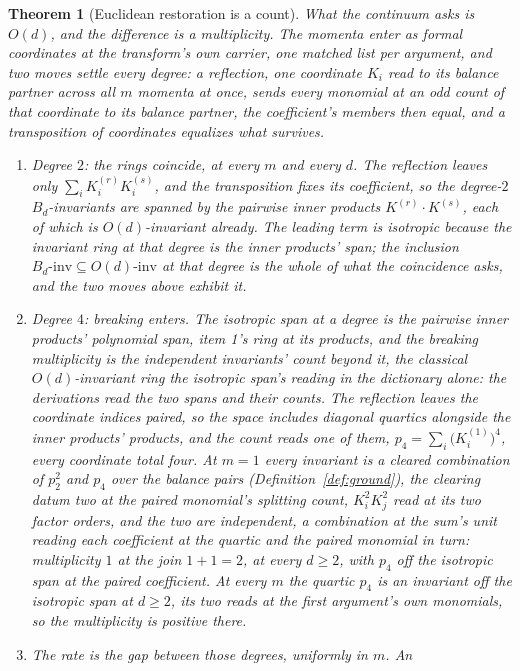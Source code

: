 \documentclass[11pt]{article}
\newtheorem{theorem}{Theorem}
\theoremstyle{definition}
\begin{document}
\begin{theorem}[Euclidean restoration is a count]
\emph{What the continuum asks is $O(d)$, and the difference is a multiplicity.}
The momenta enter as formal coordinates at the transform's own
carrier, one matched list per argument, and two moves settle every
degree: a reflection, one coordinate $K_i$
read to its balance partner
across all $m$ momenta at once, sends every monomial at an odd count
of that coordinate to its balance partner, the coefficient's
members then equal, and a transposition of
coordinates equalizes what survives.
\begin{enumerate}[leftmargin=2em,itemsep=1pt]
\item \emph{Degree $2$: the rings coincide, at every $m$ and every $d$.} The
reflection leaves only $\sum_iK^{(r)}_iK^{(s)}_i$, and the transposition fixes its
coefficient, so the degree-$2$ $B_d$-invariants are spanned by the pairwise
inner products $K^{(r)}\!\cdot\!K^{(s)}$, each of which is $O(d)$-invariant
already. The leading term is isotropic because the invariant ring at that degree
is the inner products' span; the inclusion
$B_d\text{-inv}\subseteq O(d)\text{-inv}$ at that degree is the whole of what
the coincidence asks, and the two moves above exhibit it.
\item \emph{Degree $4$: breaking enters.} The \emph{isotropic
span} at a degree is the pairwise inner products' polynomial span,
item 1's ring at its products, and the breaking
\emph{multiplicity} is the independent invariants' count beyond
it, the classical $O(d)$-invariant ring the isotropic span's
reading in the dictionary alone: the derivations
read the two spans and their counts. The reflection leaves the
coordinate indices paired, so the space includes diagonal
quartics alongside the inner products' products, and the count
reads one of them, $p_4=\sum_i\big(K^{(1)}_i\big)^4$, every
coordinate total four. At $m=1$ every invariant is a cleared
combination of $p_2^2$ and $p_4$ over the balance pairs
(Definition~\ref{def:ground}), the clearing datum two at the
paired monomial's splitting count, $K_i^2K_j^2$ read at its two
factor orders, and the two are independent, a combination at the
sum's unit reading each coefficient at the quartic and the paired
monomial in turn: multiplicity $1$ at the join $1+1=2$, at every
$d\ge2$, with $p_4$ off the isotropic span at the paired
coefficient. At every $m$ the quartic $p_4$ is an invariant off
the isotropic span at $d\ge2$, its two reads at the first
argument's own monomials, so the multiplicity is positive there.
\item \emph{The rate is the gap between those degrees, uniformly in $m$.} An

\end{enumerate}
\end{theorem}
\end{document}
